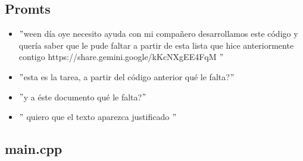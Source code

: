 \documentclass{article}
\begin{document}
	\subsection*{Promts}
		\begin{itemize}
			\item $"$ween día oye necesito ayuda
			con mi compañero desarrollamos este código y quería saber que le pude faltar a partir de esta lista que hice anteriormente contigo
			https://share.gemini.google/kKcNXgEE4FqM $"$
			\item $"$esta es la tarea, a partir del código anterior qué le falta?$"$
			\item $"$y a éste documento qué le falta?$"$
			\item $"$ quiero que el texto aparezca justificado $"$
		\end{itemize}
	\subsection*{main.cpp}

	
\end{document}
